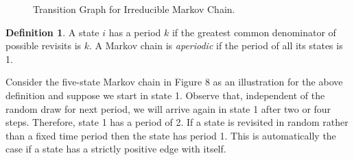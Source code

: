 \documentclass[12pt,english,a4paper,oneside]{article}
\theoremstyle{definition}
\newtheorem{definition}{Definition}[section]
\theoremstyle{definition}
\theoremstyle{definition}
\theoremstyle{definition}
\theoremstyle{remark}
\begin{document}
\begin{figure}[H]
\label{fig:ex2}
\centering


\caption{Transition Graph for Irreducible Markov Chain.}

\end{figure}

\begin{definition}
A state $i$ has a period $k$ if the greatest common denominator of possible revisits is $k$. A Markov chain is \textit{aperiodic} if the period of all its states is 1.
\end{definition}

\noindent
Consider the five-state Markov chain in Figure 8 as an illustration for the above definition and suppose we start in state 1. Observe that, independent of the random draw for next period, we will arrive again in state 1 after two or four steps. Therefore, state 1 has a period of 2. If a state is revisited in random rather than a fixed time period then the state has period 1. This is automatically the case if a state has a strictly positive edge with itself.
\end{document}
